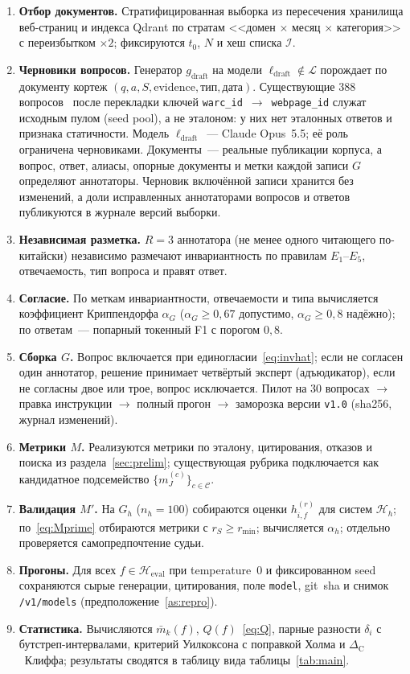\documentclass{article}
\newcommand{\Heval}{\mathcal{H}_{\mathrm{eval}}}
\newcommand{\Hh}{\mathcal{H}_{h}}
\newcommand{\Lm}{\mathcal{L}}
\newcommand{\ldraft}{\ell_{\mathrm{draft}}}
\newcommand{\gdraft}{g_{\mathrm{draft}}}
\newcommand{\rS}{r_{S}}
\newcommand{\rmin}{r_{\min}}
\newcommand{\DC}{\Delta_{\mathrm{C}}}
\begin{document}
\begin{enumerate}
  \item \textbf{Отбор документов.} Стратифицированная выборка из пересечения хранилища веб-страниц и индекса Qdrant по стратам <<домен $\times$ месяц $\times$ категория>> с переизбытком $\times2$; фиксируются $t_0$, $N$ и хеш списка $\mathcal{I}$.
  \item \textbf{Черновики вопросов.} Генератор $\gdraft$ на модели $\ldraft\notin\Lm$ порождает по документу кортеж $(q,a,S,\text{evidence},\text{тип},\text{дата})$. Существующие 388 вопросов~\cite{bagrov2026digital} после перекладки ключей \texttt{warc\_id}~$\to$~\texttt{webpage\_id} служат исходным пулом (seed pool), а не эталоном: у них нет эталонных ответов и признака статичности. Модель $\ldraft$~--- Claude Opus~5.5; её роль ограничена черновиками. Документы~--- реальные публикации корпуса, а вопрос, ответ, алиасы, опорные документы и метки каждой записи $G$ определяют аннотаторы. Черновик включённой записи хранится без изменений, а доли исправленных аннотаторами вопросов и ответов публикуются в журнале версий выборки.
  \item \textbf{Независимая разметка.} $R=3$ аннотатора (не менее одного читающего по-китайски) независимо размечают инвариантность по правилам $E_1$--$E_5$, отвечаемость, тип вопроса и правят ответ.
  \item \textbf{Согласие.} По меткам инвариантности, отвечаемости и типа вычисляется коэффициент Криппендорфа $\alpha_G$ ($\alpha_G\ge0{,}67$ допустимо, $\alpha_G\ge0{,}8$ надёжно); по ответам~--- попарный токенный F1 с порогом $0{,}8$.
  \item \textbf{Сборка $G$.} Вопрос включается при единогласии~\eqref{eq:invhat}; если не согласен один аннотатор, решение принимает четвёртый эксперт (адъюдикатор), если не согласны двое или трое, вопрос исключается. Пилот на 30 вопросах $\to$ правка инструкции $\to$ полный прогон $\to$ заморозка версии \texttt{v1.0} (sha256, журнал изменений).
  \item \textbf{Метрики $M$.} Реализуются метрики по эталону, цитирования, отказов и поиска из раздела~\ref{sec:prelim}; существующая рубрика подключается как кандидатное подсемейство $\{m_J^{(c)}\}_{c\in\mathcal{C}}$.
  \item \textbf{Валидация $M'$.} На $G_h$ ($n_h=100$) собираются оценки $h^{(r)}_{i,f}$ для систем $\Hh$; по~\eqref{eq:Mprime} отбираются метрики с $\rS\ge\rmin$; вычисляется $\alpha_h$; отдельно проверяется самопредпочтение судьи.
  \item \textbf{Прогоны.} Для всех $f\in\Heval$ при temperature~$0$ и фиксированном seed сохраняются сырые генерации, цитирования, поле \texttt{model}, git~sha и снимок \texttt{/v1/models} (предположение~\ref{as:repro}).
  \item \textbf{Статистика.} Вычисляются $\bar m_k(f)$, $Q(f)$~\eqref{eq:Q}, парные разности $\delta_i$ с бутстреп-интервалами, критерий Уилкоксона с поправкой Холма и $\DC$~Клиффа; результаты сводятся в таблицу вида таблицы~\ref{tab:main}.
\end{enumerate}
\end{document}
